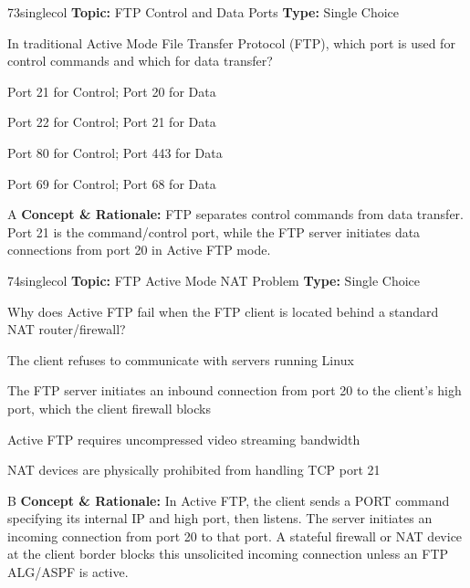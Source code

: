 \begin{qcard}{73}{singlecol}
\textcolor{darkslate!75}{\small\textbf{Topic:} FTP Control and Data Ports \hfill \textbf{Type:} Single Choice}\vspace{0.4em}\par
In traditional Active Mode File Transfer Protocol (FTP), which port is used for control commands and which for data transfer?
\begin{qoptions}
\item Port 21 for Control; Port 20 for Data
\item Port 22 for Control; Port 21 for Data
\item Port 80 for Control; Port 443 for Data
\item Port 69 for Control; Port 68 for Data
\end{qoptions}
\end{qcard}
\nopagebreak
\begin{explainbox}{A}
\textbf{Concept \& Rationale:} FTP separates control commands from data transfer. Port 21 is the command/control port, while the FTP server initiates data connections from port 20 in Active FTP mode.
\end{explainbox}

\begin{qcard}{74}{singlecol}
\textcolor{darkslate!75}{\small\textbf{Topic:} FTP Active Mode NAT Problem \hfill \textbf{Type:} Single Choice}\vspace{0.4em}\par
Why does Active FTP fail when the FTP client is located behind a standard NAT router/firewall?
\begin{qoptions}
\item The client refuses to communicate with servers running Linux
\item The FTP server initiates an inbound connection from port 20 to the client's high port, which the client firewall blocks
\item Active FTP requires uncompressed video streaming bandwidth
\item NAT devices are physically prohibited from handling TCP port 21
\end{qoptions}
\end{qcard}
\nopagebreak
\begin{explainbox}{B}
\textbf{Concept \& Rationale:} In Active FTP, the client sends a PORT command specifying its internal IP and high port, then listens. The server initiates an incoming connection from port 20 to that port. A stateful firewall or NAT device at the client border blocks this unsolicited incoming connection unless an FTP ALG/ASPF is active.
\end{explainbox}

